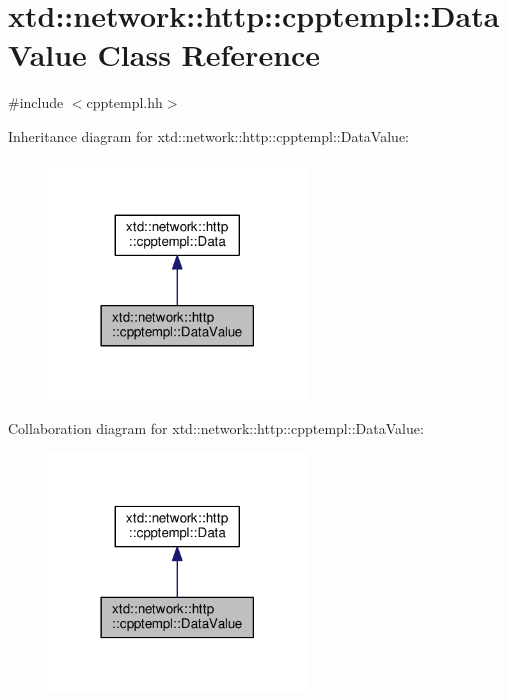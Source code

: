 \hypertarget{classxtd_1_1network_1_1http_1_1cpptempl_1_1DataValue}{\section{xtd\-:\-:network\-:\-:http\-:\-:cpptempl\-:\-:Data\-Value Class Reference}
\label{classxtd_1_1network_1_1http_1_1cpptempl_1_1DataValue}
}


{\ttfamily \#include $<$cpptempl.\-hh$>$}



Inheritance diagram for xtd\-:\-:network\-:\-:http\-:\-:cpptempl\-:\-:Data\-Value\-:
\nopagebreak
\begin{figure}[H]
\begin{center}
\leavevmode
\includegraphics[width=194pt]{classxtd_1_1network_1_1http_1_1cpptempl_1_1DataValue__inherit__graph}
\end{center}
\end{figure}


Collaboration diagram for xtd\-:\-:network\-:\-:http\-:\-:cpptempl\-:\-:Data\-Value\-:
\nopagebreak
\begin{figure}[H]
\begin{center}
\leavevmode
\includegraphics[width=194pt]{classxtd_1_1network_1_1http_1_1cpptempl_1_1DataValue__coll__graph}
\end{center}
\end{figure}
